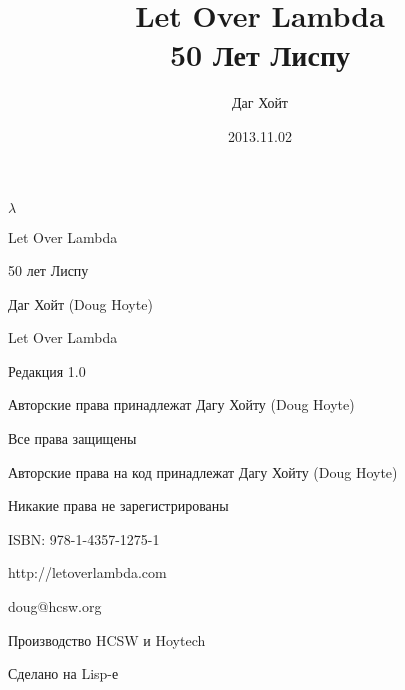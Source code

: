 \documentclass[a4paper, 12pt]{book}
\title{Let Over Lambda \\50 Лет Лиспу}
\date{2013.11.02}
\author{Даг Хойт}
\begin{document}
\renewcommand {\contentsname} {Оглавление}
\renewcommand {\chaptername} {Глава}
%
\maketitle
\begin{center}
{\LARGE $\lambda$}

Let Over Lambda

50 лет Лиспу

Даг Хойт (Doug Hoyte)

Let Over Lambda

Редакция 1.0

Авторские права принадлежат Дагу Хойту (Doug Hoyte)

Все права защищены

Авторские права на код принадлежат Дагу Хойту (Doug Hoyte)

Никакие права не зарегистрированы

ISBN: 978-1-4357-1275-1

http://letoverlambda.com

doug@hcsw.org

Производство HCSW и Hoytech

Сделано на Lisp-е
\end{center}
\tableofcontents




\end{document}

